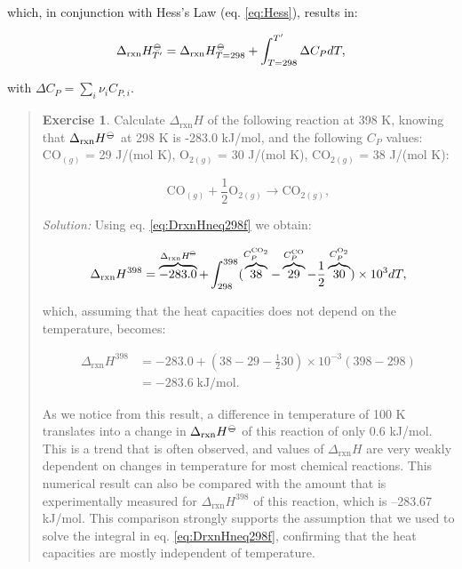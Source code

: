\documentclass[
  9pt,
]{extbook}
\theoremstyle{definition}
\theoremstyle{definition}
\theoremstyle{definition}
\newtheorem{exercise}{Exercise}[chapter]
\theoremstyle{remark}
\begin{document}
which, in conjunction with Hess's Law (eq. \eqref{eq:Hess}), results in:

\begin{equation}
 \Delta_{\text{rxn}} H_{T'}^{-\kern-6pt{\ominus}\kern-6pt-}= \Delta_{\text{rxn}} H_{T=298}^{-\kern-6pt{\ominus}\kern-6pt-}+ \int_{T=298}^{T'} \Delta C_P dT,
  \label{eq:DrxnHneq298f}
\end{equation}

with \(\Delta C_P = \sum_i \nu_i C_{P,i}\).

\begin{quote}
\begin{exercise}
\protect\hypertarget{exr:DHtdiff298}{}{\label{exr:DHtdiff298} }Calculate \(\Delta_{\text{rxn}}H\) of the following reaction at 398 K, knowing that \(\Delta_{\text{rxn}}H^{-\kern-6pt{\ominus}\kern-6pt-}\) at 298 K is -283.0 kJ/mol, and the following \(C_P\) values: \(\mathrm{CO}_{(g)}\) = 29 J/(mol K), \(\mathrm{O}_{2(g)}\) = 30 J/(mol K), \(\mathrm{CO}_{2(g)}\) = 38 J/(mol K):

\[
\mathrm{CO}_{(g)}+\frac{1}{2}\mathrm{O}_{2(g)} \rightarrow \mathrm{CO}_{2(g)},
\]

\emph{Solution:} Using eq. \eqref{eq:DrxnHneq298f} we obtain:

\[
 \Delta_{\text{rxn}} H^{398} = \overbrace{-283.0}^{\Delta_{\text{rxn}}H^{-\kern-6pt{\ominus}\kern-6pt-}} + \int_{298}^{398} ( \overbrace{38}^{C_P^{\mathrm{CO}_2}} -\overbrace{29}^{C_P^{\mathrm{CO}}} -\frac{1}{2}\overbrace{30}^{C_P^{\mathrm{O}_2}} ) \times 10^{3} dT,
\]

which, assuming that the heat capacities does not depend on the temperature, becomes:

\begin{equation}
\begin{aligned}
 \Delta_{\text{rxn}} H^{398} &= -283.0 + \left(38-29-\frac{1}{2}30 \right) \times 10^{-3} (398-298) \\ &= -283.6 \; \text{kJ/mol}.
\end{aligned}
\end{equation}

As we notice from this result, a difference in temperature of 100 K translates into a change in \(\Delta_{\text{rxn}}H^{-\kern-6pt{\ominus}\kern-6pt-}\) of this reaction of only 0.6 kJ/mol. This is a trend that is often observed, and values of \(\Delta_{\text{rxn}}H\) are very weakly dependent on changes in temperature for most chemical reactions. This numerical result can also be compared with the amount that is experimentally measured for \(\Delta_{\text{rxn}}H^{398}\) of this reaction, which is --283.67 kJ/mol. This comparison strongly supports the assumption that we used to solve the integral in eq. \eqref{eq:DrxnHneq298f}, confirming that the heat capacities are mostly independent of temperature.
\end{exercise}
\end{quote}
\end{document}
